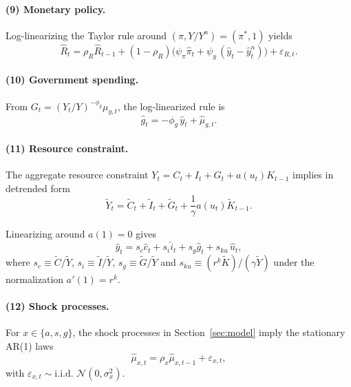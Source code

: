 \paragraph{(9) Monetary policy.}
Log-linearizing the Taylor rule around $(\pi, Y/Y^n)=(\pi^*,1)$ yields
\begin{equation}
	\hat R_t = \rho_R\hat R_{t-1} + (1-\rho_R)\Big(\psi_{\pi}\hat\pi_t + \psi_y\,(\hat y_t-\hat y_t^{n})\Big) + \varepsilon_{R,t}.
	\label{eq:loglin_taylor}
\end{equation}

\paragraph{(10) Government spending.}
From $G_t=(Y_t/Y)^{-\phi_g}\mu_{g,t}$, the log-linearized rule is
\begin{equation}
	\hat g_t = -\phi_g\,\hat y_t + \hat\mu_{g,t}.
	\label{eq:loglin_g}
\end{equation}

\paragraph{(11) Resource constraint.}
The aggregate resource constraint $Y_t=C_t+I_t+G_t+a(u_t)K_{t-1}$ implies in detrended form
\begin{equation}
	\tilde Y_t = \tilde C_t + \tilde I_t + \tilde G_t + \frac{1}{\gamma}a(u_t)\tilde K_{t-1}.
	\label{eq:rc_detrended}
\end{equation}

Linearizing around $a(1)=0$ gives
\begin{equation}
	\hat y_t = s_c\hat c_t + s_i\hat i_t + s_g\hat g_t + s_{ku}\,\hat u_t,
	\label{eq:loglin_rc}
\end{equation}
where $s_c\equiv \tilde C/\tilde Y$, $s_i\equiv \tilde I/\tilde Y$, $s_g\equiv \tilde G/\tilde Y$ and $s_{ku}\equiv (r^k\tilde K)/(\gamma\tilde Y)$ under the normalization $a'(1)=r^k$.

\paragraph{(12) Shock processes.}
For $x\in\{a,s,g\}$, the shock processes in Section~\ref{sec:model} imply the stationary AR(1) laws
\begin{equation}
	\hat\mu_{x,t} = \rho_x\hat\mu_{x,t-1} + \varepsilon_{x,t},
\end{equation}
with $\varepsilon_{x,t} \sim \text{i.i.d. } \mathcal{N}(0, \sigma_x^2)$.

